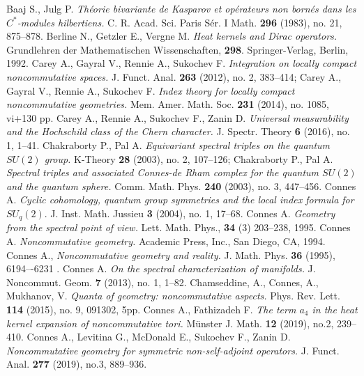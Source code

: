 \documentclass[12pt]{article}
\begin{document}
\begin{thebibliography}{99}
\setlength{\itemsep}{0pt}
\setlength{\parskip}{0pt}
\setlength{\parsep}{0pt}
 Baaj S., Julg P. {\it Th\'eorie bivariante de Kasparov et op\'erateurs non born\'es dans les $C^*$-modules hilbertiens.} C. R. Acad. Sci. Paris S\'er. I Math. {\bf 296} (1983), no. 21, 875--878.
 Berline N., Getzler E., Vergne M. {\it Heat kernels and Dirac operators.} Grundlehren der Mathematischen Wissenschaften, {\bf 298}. Springer-Verlag, Berlin, 1992.
 Carey A., Gayral V., Rennie A., Sukochev F. {\it Integration on locally compact noncommutative spaces.} J. Funct. Anal. {\bf 263} (2012), no. 2, 383--414; Carey A., Gayral V., Rennie A., Sukochev F. {\it Index theory for locally compact noncommutative geometries.} Mem. Amer. Math. Soc. {\bf 231} (2014), no. 1085, vi+130 pp.
 Carey A., Rennie A., Sukochev F., Zanin D. {\it Universal measurability and the Hochschild class of the Chern character.} J. Spectr. Theory {\bf 6} (2016), no. 1, 1--41.
 Chakraborty P., Pal A. {\it Equivariant spectral triples on the quantum $SU(2)$ group.} K-Theory {\bf 28} (2003), no. 2, 107--126;  Chakraborty P., Pal A. {\it Spectral triples and associated Connes-de Rham complex for the quantum $SU(2)$ and the quantum sphere.} Comm. Math. Phys. {\bf 240} (2003), no. 3, 447--456.
 Connes A. {\it Cyclic cohomology, quantum group symmetries and the local index formula for $SU_q(2).$} J. Inst. Math. Jussieu {\bf 3} (2004), no. 1, 17--68.
 Connes A. {\it Geometry from the spectral point of view.} Lett. Math. Phys., {\bf 34} (3) 203--238, 1995.
  Connes A. {\it Noncommutative geometry.} Academic Press, Inc., San Diego, CA, 1994.
 Connes A., {\it Noncommutative geometry and reality.} J. Math. Phys. {\bf 36} (1995), 6194–-6231 .
 Connes A. {\it On the spectral characterization of manifolds.} J. Noncommut. Geom. {\bf 7} (2013), no. 1, 1--82.
 Chamseddine, A., Connes, A., Mukhanov, V. {\it Quanta of geometry: noncommutative aspects.} Phys. Rev. Lett. {\bf 114} (2015), no. 9, 091302, 5pp.
 Connes A., Fathizadeh F. {\it The term $a_4$ in the heat kernel expansion of noncommutative tori.} M\"unster J. Math. {\bf 12} (2019), no.2, 239--410.
 Connes A., Levitina G., McDonald E., Sukochev F., Zanin D. {\it Noncommutative geometry for symmetric non-self-adjoint operators.} J. Funct. Anal. {\bf 277} (2019), no.3, 889--936.

\end{thebibliography}
\end{document}
